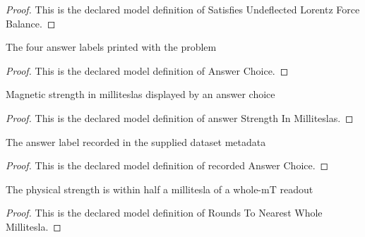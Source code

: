 \begin{proof}
  This is the declared model definition of Satisfies Undeflected Lorentz Force Balance.
\end{proof}
\begin{definition}
  \label{def:physics:phyx-mini-0640:phyxminiproblems-problemphyxmini0640-answerchoice}
  The four answer labels printed with the problem
\end{definition}
\begin{proof}
  This is the declared model definition of Answer Choice.
\end{proof}
\begin{definition}
  \label{def:physics:phyx-mini-0640:phyxminiproblems-problemphyxmini0640-answerstrengthinmilliteslas}
  Magnetic strength in milliteslas displayed by an answer choice
\end{definition}
\begin{proof}
  This is the declared model definition of answer Strength In Milliteslas.
\end{proof}
\begin{definition}
  \label{def:physics:phyx-mini-0640:phyxminiproblems-problemphyxmini0640-recordedanswerchoice}
  The answer label recorded in the supplied dataset metadata
\end{definition}
\begin{proof}
  This is the declared model definition of recorded Answer Choice.
\end{proof}
\begin{definition}
  \label{def:physics:phyx-mini-0640:phyxminiproblems-problemphyxmini0640-roundstonearestwholemillitesla}
  The physical strength is within half a millitesla of a whole-mT readout
\end{definition}
\begin{proof}
  This is the declared model definition of Rounds To Nearest Whole Millitesla.
\end{proof}
